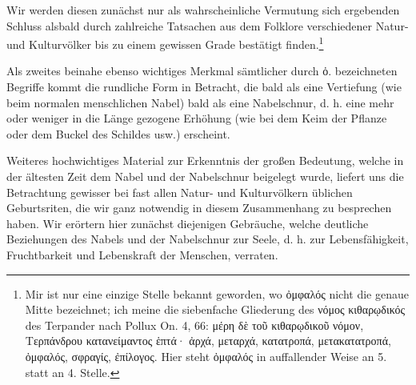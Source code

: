 \documentclass[a4paper, 11pt, oneside]{article}
\begin{document}
Wir werden diesen zunächst nur als wahrscheinliche Vermutung sich ergebenden Schluss alsbald durch zahlreiche Tatsachen aus dem Folklore verschiedener Natur- und Kulturvölker bis zu einem gewissen Grade bestätigt finden.\footnote{Mir ist nur eine einzige Stelle bekannt geworden, wo ὀμφαλός nicht die genaue Mitte bezeichnet; ich meine die siebenfache Gliederung des νόμος κιθαρῳδικός des Terpander nach Pollux On. 4, 66: μέρη δὲ τοῦ κιθαρῳδικοῦ νόμον, Τερπάνδρου κατανείμαντος ἑπτά· ἀρχά, μεταρχά, κατατροπά, μετακατατροπά, ὀμφαλός, σφραγίς, ἐπίλογος. Hier steht ὀμφαλός in auffallender Weise an 5. statt an 4. Stelle.}

Als zweites beinahe ebenso wichtiges Merkmal sämtlicher durch ὀ. bezeichneten Begriffe kommt die rundliche Form in Betracht, die bald als eine Vertiefung (wie beim normalen menschlichen Nabel) bald als eine Nabelschnur, d. h. eine mehr oder weniger in die Länge gezogene Erhöhung (wie bei dem Keim der Pflanze oder dem Buckel des Schildes usw.) erscheint.

Weiteres hochwichtiges Material zur Erkenntnis der großen Bedeutung, welche in der ältesten Zeit dem Nabel und der Nabelschnur beigelegt wurde, liefert uns die Betrachtung gewisser bei fast allen Natur- und Kulturvölkern üblichen Geburtsriten, die wir ganz notwendig in diesem Zusammenhang zu besprechen haben. Wir erörtern hier zunächst diejenigen Gebräuche, welche deutliche Beziehungen des Nabels und der Nabelschnur zur Seele, d. h. zur Lebensfähigkeit, Fruchtbarkeit und Lebenskraft der Menschen, verraten.
\end{document}
